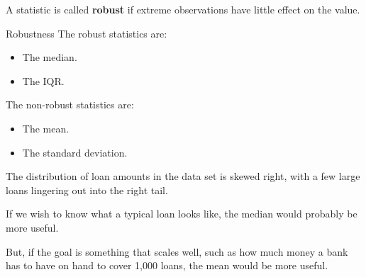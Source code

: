 \documentclass[handout]{beamer}
\begin{document}
\begin{frame}
\begin{definition}
A statistic is called \textbf{robust} if extreme observations have little effect on the value.
\end{definition}\pause

\begin{block}{Robustness}
The robust statistics are:
\begin{itemize}
\item The median.
\item The IQR.\@
\end{itemize}\pause

The non-robust statistics are:
\begin{itemize}
\item The mean.
\item The standard deviation.
\end{itemize}
\end{block}
\end{frame}

\begin{frame}
\begin{example}
The distribution of loan amounts in the  data set is skewed right, with a few large loans lingering out into the right tail.
\begin{center}
\end{center}
\pause
{}\pause

\vspace{1.5mm}
If we wish to know what a typical loan looks like, the median would probably be more useful. \pause

\vspace{1.5mm}
But, if the goal is something that scales well, such as how much money a bank has to have on hand to cover 1,000 loans, the mean would be more useful.
\end{example}
\end{frame}
\end{document}
